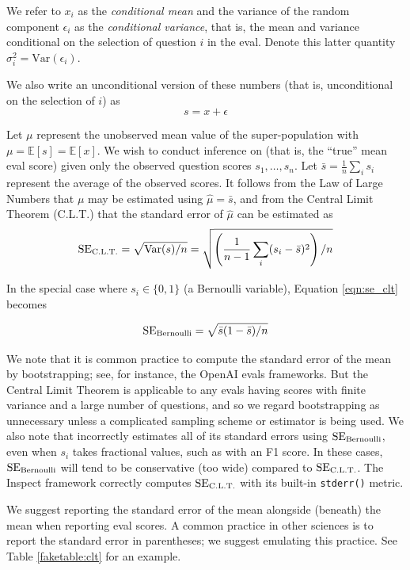 \documentclass[11pt, oneside]{article}   	%
\newcommand{\E}{\mathbb{E}}
\newcommand{\Var}{\mathrm{Var}}
\newcommand{\standarderror}{\mathrm{SE}}
\begin{document}
We refer to $x_i$ as the {\em conditional mean} and the variance of the random component $\epsilon_i$ as the {\em conditional variance}, that is, the mean and variance conditional on the selection of question $i$ in the eval. Denote this latter quantity $\sigma_i^2=\Var(\epsilon_i)$.

We also write an unconditional version of these numbers (that is, unconditional on the selection of $i$) as
\[
s = x + \epsilon
\]

Let $\mu$ represent the unobserved mean value of the super-population with $\mu=\E[s]=\E[x]$. We wish to conduct inference on  (that is, the ``true'' mean eval score) given only the observed question scores $s_1,\ldots,s_n$. Let $\bar{s}=\frac{1}{n}\sum_i s_i$ represent the average of the observed scores. It follows from the Law of Large Numbers that $\mu$ may be estimated using $\hat{\mu}=\bar{s}$, and from the Central Limit Theorem (C.L.T.) that the standard error of $\hat{\mu}$ can be estimated as
\begin{equation}
\label{eqn:se_clt}
\standarderror_{\rm C.L.T.} = \sqrt{\Var(s)/n}=\sqrt{\left(\frac{1}{n-1}\sum_i(s_i-\bar{s})^2\right)/n}
\end{equation}

In the special case where $s_i \in \{0, 1\}$ (a Bernoulli variable), Equation \ref{eqn:se_clt} becomes

\begin{equation}
\label{eqn:se_bernoulli}
\standarderror_{\rm Bernoulli} = \sqrt{\bar{s}(1-\bar{s})/n}
\end{equation}

We note that it is common practice to compute the standard error of the mean by bootstrapping; see, for instance, the OpenAI evals\cite{openai-evals} frameworks. But the Central Limit Theorem is applicable to any evals having scores with finite variance and a large number of questions, and so we regard bootstrapping as unnecessary unless a complicated sampling scheme or estimator is being used. We also note that \cite{dubey2024llama3herdmodels} incorrectly estimates all of its standard errors using $\standarderror_{\rm Bernoulli}$, even when $s_i$ takes fractional values, such as with an F1 score. In these cases, $\standarderror_{\rm Bernoulli}$ will tend to be conservative (too wide) compared to $\standarderror_{\rm C.L.T.}$. The Inspect framework\cite{uk-inspect} correctly computes $\standarderror_{\rm C.L.T.}$ with its built-in \texttt{stderr()} metric.

We suggest reporting the standard error of the mean alongside (beneath) the mean when reporting eval scores. A common practice in other sciences is to report the standard error in parentheses; we suggest emulating this practice. See Table \ref{faketable:clt} for an example.
\end{document}
